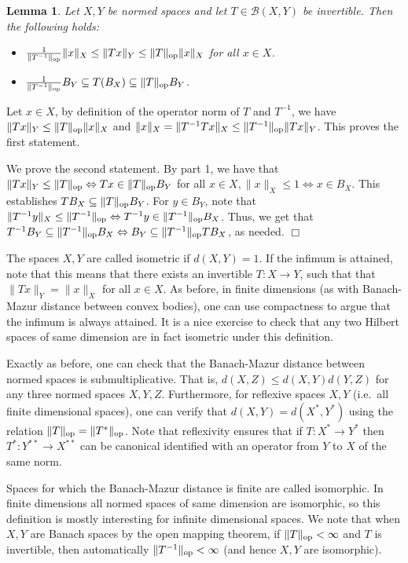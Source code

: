 \documentclass[11pt]{article}
\newtheorem{lemma}[theorem]{Lemma}
\theoremstyle{plain}
\newenvironment{proof}{\noindent {\sc Proof:}}{$\Box$ \medskip}
\theoremstyle{plain}
\begin{document}
\begin{lemma} 
Let $X,Y$ be normed spaces and let $T \in \mathcal{B}(X,Y)$ be
invertible. Then the following holds:
\begin{itemize}
\item $\frac{1}{\|T^{-1}\|_{\rm op}} \|x\|_X \leq \|Tx\|_Y \leq \|T\|_{\rm op}
\|x\|_X$ for all $x \in X$.
\item $\frac{1}{\|T^{-1}\|_{\rm op}} B_Y \subseteq T(B_X) \subseteq \|T\|_{\rm
op} B_Y$.
\end{itemize}
\end{lemma}
\begin{proof}
Let $x \in X$, by definition of the operator norm of $T$ and $T^{-1}$, we have
$\|Tx\|_Y \leq \|T\|_{\rm op}\|x\|_X$ and $\|x\|_X = \|T^{-1} T x\|_X \leq
\|T^{-1}\|_{\rm op} \|T x\|_Y$. This proves the first statement.

We prove the second statement. By part 1, we have that $\|T x\|_Y \leq
\|T\|_{\rm op} \Leftrightarrow Tx \in \|T\|_{\rm op} B_Y$ for all $x \in X,
\|x\|_X \leq 1 \Leftrightarrow x \in B_X$. This establishes $TB_X \subseteq
\|T\|_{\rm op} B_Y$. For $y \in B_Y$, note that $\|T^{-1} y\|_X \leq
\|T^{-1}\|_{\rm op} \Leftrightarrow T^{-1} y \in \|T^{-1}\|_{\rm op} B_X$. Thus,
we get that $T^{-1} B_Y \subseteq \|T^{-1}\|_{\rm op} B_X \Leftrightarrow B_Y
\subseteq \|T^{-1}\|_{\rm op} T B_X$, as needed. 
\end{proof}

The spaces $X,Y$ are called isometric if $d(X,Y) = 1$. If the infimum is
attained, note that this means that there exists an invertible $T: X
\rightarrow Y$, such that that $\|Tx\|_Y = \|x\|_X$ for all $x \in X$. As
before, in finite dimensions (as with Banach-Mazur distance between convex
bodies), one can use compactness to argue that the infimum is always attained.
It is a nice exercise to check that any two Hilbert spaces of same dimension are
in fact isometric under this definition.

Exactly as before, one can check that the Banach-Mazur distance between normed
spaces is submultiplicative. That is, $d(X,Z) \leq d(X,Y) d(Y,Z)$ for any three
normed spaces $X,Y,Z$. Furthermore, for reflexive spaces $X,Y$ (i.e.~all finite
dimensional spaces), one can verify that $d(X,Y) = d(X^*,Y^*)$ using the
relation $\|T\|_{\rm op} = \|T^*\|_{\rm op}$. Note that reflexivity ensures that
if $T: X^* \rightarrow Y^*$ then $T^*: Y^{**} \rightarrow X^{**}$ can be
canonical identified with an operator from $Y$ to $X$ of the same norm. 

Spaces for which the Banach-Mazur distance is finite are called isomorphic. In
finite dimensions all normed spaces of same dimension are isomorphic, so this
definition is mostly interesting for infinite dimensional spaces. We note that
when $X,Y$ are Banach spaces by the open mapping theorem, if $\|T\|_{\rm op} <
\infty$ and $T$ is invertible, then automatically $\|T^{-1}\|_{\rm op} < \infty$
(and hence $X,Y$ are isomorphic). 



\end{document}
